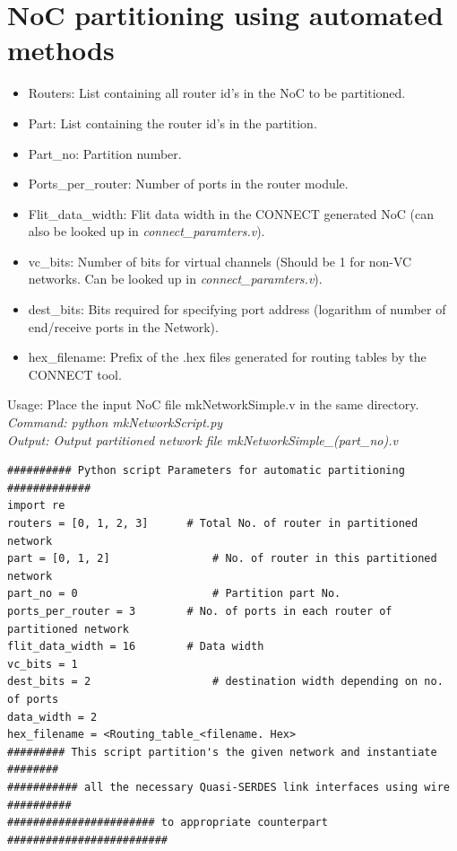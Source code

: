 \section{NoC partitioning using automated methods}

\begin{itemize} 
	\item{Routers: List containing all router id’s in the NoC to be partitioned.}
	\item{Part: List containing the router id’s in the partition.}
	\item{Part\_no: Partition number.}
	\item{Ports\_per\_router: Number of ports in the router module.}
	\item{Flit\_data\_width: Flit data width in the CONNECT generated NoC (can also be looked up in \textit{connect\_paramters.v}).}
	\item{vc\_bits: Number of bits for virtual channels (Should be 1 for non-VC networks. Can be looked up in \textit{connect\_paramters.v}).}
	\item{dest\_bits: Bits required for specifying port address (logarithm of number of end/receive ports in the Network).}
	\item{hex\_filename: Prefix of the .hex files generated for routing tables by the CONNECT tool.}
\end{itemize}
Usage: Place the input NoC file mkNetworkSimple.v in the same directory.\\
\textit{
Command: python mkNetworkScript.py\\
Output: Output partitioned network file mkNetworkSimple\_(part\_no).v\\
}
\begin{lstlisting}
########## Python script Parameters for automatic partitioning #############
import re
routers = [0, 1, 2, 3]		# Total No. of router in partitioned network
part = [0, 1, 2] 				# No. of router in this partitioned network
part_no = 0 					# Partition part No.
ports_per_router = 3 		# No. of ports in each router of partitioned network
flit_data_width = 16 		# Data width
vc_bits = 1
dest_bits = 2					# destination width depending on no. of ports
data_width = 2
hex_filename = <Routing_table_<filename. Hex>
######### This script partition's the given network and instantiate ########
########### all the necessary Quasi-SERDES link interfaces using wire ##########
####################### to appropriate counterpart #########################
\end{lstlisting}

